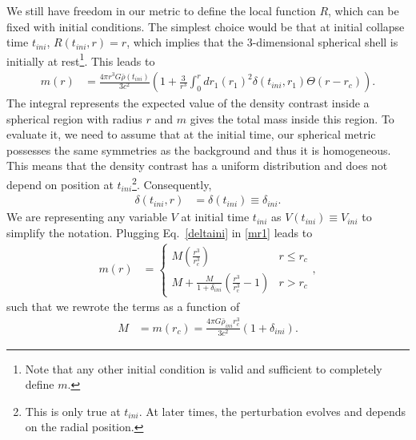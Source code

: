 \documentclass[a4paper,11pt]{article}
\begin{document}
We still have freedom in our metric to define the local function $R$, which can be fixed with initial conditions. The simplest choice would be that at initial collapse time $t_{ini}$, $R(t_{ini},r) = r$, which implies that the 3-dimensional spherical shell is initially at rest\footnote{Note that any other initial condition is valid and sufficient to completely define $m$.}. This leads to
\begin{align}
	\label{mr1}
	m(r) &= \frac{4\pi r^3G \bar{\rho}(t_{ini})}{3c^2}\left(1 + \frac{3}{r^3}\int_0^r dr_1 (r_1)^2\delta(t_{ini}, r_1)\Theta(r-r_c)\right)
	.\end{align}
The integral represents the expected value of the density contrast inside a spherical region with radius $r$ and $m$ gives the total mass inside this region. To evaluate it, we need to assume that at the initial time, our spherical metric possesses the same symmetries as the background and thus it is homogeneous. This means that the density contrast has a uniform distribution and does not depend on position at $t_{ini}$\footnote{This is only true at $t_{ini}$. At later times, the perturbation evolves and depends on the radial position.}. Consequently, 
\begin{align}
	\label{deltaini}
	\delta(t_{ini}, r)  &= \delta(t_{ini}) \equiv  \delta_{ini}
	.\end{align}
We are representing any variable $V$ at initial time $t_{ini}$ as $V(t_{ini})\equiv V_{ini}$ to simplify the notation. Plugging Eq.~\eqref{deltaini} in \eqref{mr1} leads to 
\begin{align}
\label{pbhmassmetric}
	m (r)&=  \left\{\begin{array}{ll}
		M\left(\frac{r^3}{r_c^3}\right) &r \leq r_c \\
		M+\frac{M}{1+\delta_{ini}}\left(\frac{r^3}{r_{\mathrm{c}}^3}-1\right)  & r > r_c
	\end{array}\right.,
\end{align}
such that we rewrote the terms as a function of 
\begin{align}
	M&=m(r_c)=\frac{4\pi G \bar{\rho}_{ini}r^3_c}{3c^2}\left(1 + \delta_{ini}\right)
	.\end{align}
\end{document}
